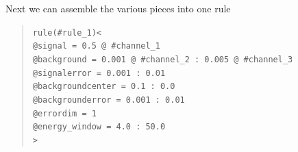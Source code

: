 Next we can assemble the various pieces into one rule
\begin{quote}
{\tt rule(\#rule\_1)<\\
\tb @signal = 0.5 @ \#channel\_1\\
\tb @background = 0.001 @ \#channel\_2 :  0.005 @ \#channel\_3\\
\tb @signalerror =       0.001  :       0.01\\
\tb @backgroundcenter =  0.1 :       0.0\\
\tb @backgrounderror =   0.001 :       0.01\\
\tb @errordim = 1\\
\tb @energy\_window = 4.0 : 50.0\\ 
>}
\end{quote}




